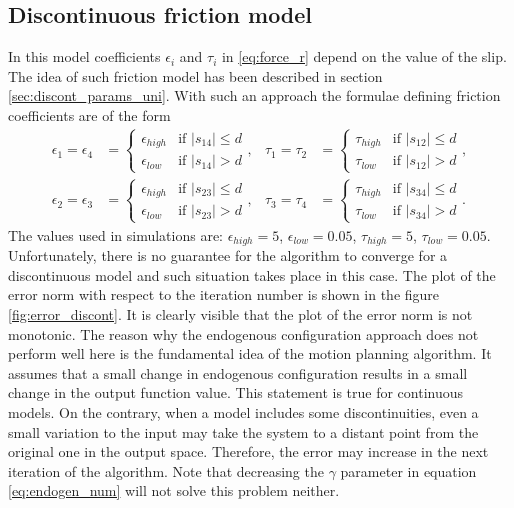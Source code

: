 \subsection{Discontinuous friction model}
In this model coefficients $\epsilon_i$ and $\tau_i$ in \eqref{eq:force_r} depend
on the value of the slip. The idea of such friction model has been described
in section \ref{sec:discont_params_uni}. With such an approach the formulae defining
friction coefficients are of the form
\begin{equation*}
\begin{aligned}
\epsilon_1=\epsilon_4&=\begin{cases}
\epsilon_{high} &\mbox{if } |s_{14}| \leq d \\
\epsilon_{low} &\mbox{if } |s_{14}| > d
\end{cases}, &
\tau_1=\tau_2&=\begin{cases}
\tau_{high} &\mbox{if } |s_{12}| \leq d \\
\tau_{low} &\mbox{if } |s_{12}| > d
\end{cases},\\
\epsilon_2=\epsilon_3&=\begin{cases}
\epsilon_{high} &\mbox{if } |s_{23}| \leq d \\
\epsilon_{low} &\mbox{if } |s_{23}| > d
\end{cases}, &
\tau_3=\tau_4&=\begin{cases}
\tau_{high} &\mbox{if } |s_{34}| \leq d \\
\tau_{low} &\mbox{if } |s_{34}| > d
\end{cases}.
\end{aligned}
\end{equation*}
The values used in simulations are: $\epsilon_{high}=5$, $\epsilon_{low}=0.05$, $\tau_{high}=5$, $\tau_{low}=0.05$. Unfortunately, there is no guarantee for the algorithm to converge for a discontinuous model and such situation takes place in this case. The plot of the error norm with respect to the iteration number is shown in the figure \ref{fig:error_discont}. It is clearly visible that the plot of the error norm is not monotonic. The reason why the endogenous configuration approach does not perform well here is the fundamental idea of the motion planning algorithm. It assumes that a small change in endogenous configuration results in a small change in the output function value. This statement is true for continuous models. On the contrary, when a model includes some discontinuities, even a small variation to the input may take the system to a distant point from the original one in the output space. Therefore, the error may increase in the next iteration of the algorithm. Note that decreasing the $\gamma$ parameter in equation \eqref{eq:endogen_num} will not solve this problem neither.
